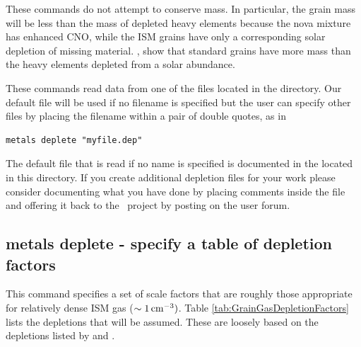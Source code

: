 These commands do not attempt to conserve mass.
In particular, the grain
mass will be less than the mass of depleted heavy elements
because the nova
mixture has enhanced CNO, while the ISM grains have only
a corresponding
solar depletion of missing material.
\citet{Snow1996}, show that standard grains have more mass than the
heavy elements depleted from a solar abundance.

These  commands read data from 
one of the  files located in the
 directory.
Our default file will be used if no filename is specified but
the user can specify other files by placing the filename within
a pair of double quotes, as in
\begin{verbatim}
metals deplete "myfile.dep"
\end{verbatim}
The default file that is read if no name is specified is documented in the 
located in this directory.
If you create additional depletion files for your work please consider documenting what
you have done by placing comments inside the file and offering it back to the \Cloudy\ project
by posting on the user forum.

\subsection{metals deplete - specify a table of depletion factors}

This command specifies a set of scale factors that are roughly those appropriate for
relatively dense ISM gas ($\sim 1 {\rm\thinspace cm^{-3}})$.
Table \ref{tab:GrainGasDepletionFactors} lists
the depletions that will be assumed.
These are loosely based
on the depletions listed by \citet{Jenkins1987} and \citet{Cowie1986}.

